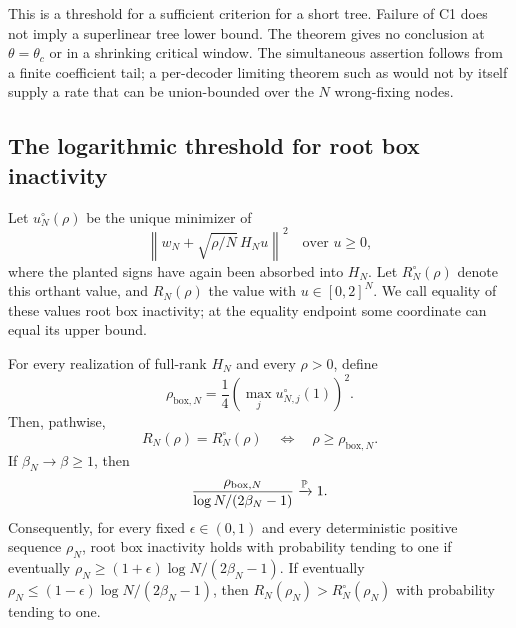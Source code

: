 This is a threshold for a sufficient criterion for a short tree.  Failure
of C1 does not imply a superlinear tree lower bound.  The theorem gives no
conclusion at $\theta=\theta_c$ or in a shrinking critical window.
The simultaneous assertion follows from a finite coefficient tail; a
per-decoder limiting theorem such as
\citet{huLu2020LimitingPoissonMIMO} would not by itself supply a rate that
can be union-bounded over the $N$ wrong-fixing nodes.

\subsection{The logarithmic threshold for root box inactivity}
\label{bls:root-inactivity}

Let $u_N^\circ(\rho)$ be the unique minimizer of
\[
 \left\|w_N+\sqrt{\rho/N}\,H_Nu\right\|^2\quad\text{over }u\ge0,
\]
where the planted signs have again been absorbed into $H_N$.  Let
$R_N^\circ(\rho)$ denote this orthant value, and $R_N(\rho)$ the value
with $u\in[0,2]^N$.  We call equality of these values root box inactivity;
at the equality endpoint some coordinate can equal its upper bound.

\begin{theorem}
\label{bls:root-threshold}
For every realization of full-rank $H_N$ and every $\rho>0$, define
\begin{equation}
 \rho_{\mathrm{box},N}=\frac14
           \left(\max_j u_{N,j}^\circ(1)\right)^2.
 \label{bls:random-root-cutoff}
\end{equation}
Then, pathwise,
\begin{equation}
 R_N(\rho)=R_N^\circ(\rho)
 \quad\Longleftrightarrow\quad \rho\ge\rho_{\mathrm{box},N}.
 \label{bls:pathwise-root-cutoff}
\end{equation}
If $\beta_N\to\beta\ge1$, then
\begin{equation}
 \frac{\rho_{\mathrm{box},N}}{\log N/(2\beta_N-1)}
       \xrightarrow{\mathbb{P}}1.
 \label{bls:root-cutoff-scale}
\end{equation}
Consequently, for every fixed $\epsilon\in(0,1)$ and every deterministic
positive sequence $\rho_N$, root box inactivity holds with probability
tending to one if eventually
$\rho_N\ge(1+\epsilon)\log N/(2\beta_N-1)$.  If eventually
$\rho_N\le(1-\epsilon)\log N/(2\beta_N-1)$, then
$R_N(\rho_N)>R_N^\circ(\rho_N)$ with probability tending to one.
\end{theorem}

